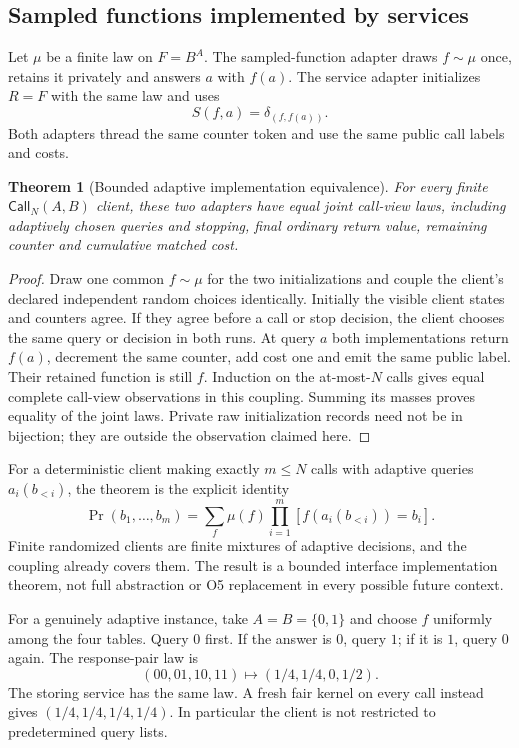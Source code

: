 \documentclass[11pt,a4paper]{article}
\newtheorem{theorem}{Theorem}[section]
\theoremstyle{definition}
\newcommand{\Call}{\mathsf{Call}}
\begin{document}
\subsection{Sampled functions implemented by services}
Let $\mu$ be a finite law on $F=B^A$. The sampled-function adapter draws
$f\sim\mu$ once, retains it privately and answers $a$ with $f(a)$. The
service adapter initializes $R=F$ with the same law and uses
\[
 S(f,a)=\delta_{(f,f(a))}.
\]
Both adapters thread the same counter token and use the same public call
labels and costs.

\begin{theorem}[Bounded adaptive implementation equivalence]\label{thm:service}
For every finite $\Call_N(A,B)$ client, these two adapters have equal
joint call-view laws, including adaptively chosen queries and stopping,
final ordinary return value, remaining counter and cumulative matched cost.
\end{theorem}
\begin{proof}
Draw one common $f\sim\mu$ for the two initializations and couple the
client's declared independent random choices identically. Initially the
visible client states and counters agree. If they agree before a call or
stop decision, the client chooses the same query or decision in both runs.
At query $a$ both implementations return $f(a)$, decrement the same counter,
add cost one and emit the same public label. Their retained function is
still $f$. Induction on the at-most-$N$ calls gives equal complete
call-view observations in this coupling. Summing its masses proves equality
of the joint laws. Private raw initialization records need not be in
bijection; they are outside the observation claimed here.
\end{proof}
For a deterministic client making exactly $m\le N$ calls with adaptive
queries $a_i(b_{<i})$, the theorem is the explicit identity
\[
 \Pr(b_1,\ldots,b_m)
 =\sum_f\mu(f)\prod_{i=1}^m
     [f(a_i(b_{<i}))=b_i].
\]
Finite randomized clients are finite mixtures of adaptive decisions, and
the coupling already covers them. The result is a bounded interface
implementation theorem, not full abstraction or O5 replacement in every
possible future context.

For a genuinely adaptive instance, take $A=B=\{0,1\}$ and choose $f$
uniformly among the four tables. Query $0$ first. If the answer is $0$,
query $1$; if it is $1$, query $0$ again. The response-pair law is
\[
 (00,01,10,11)\longmapsto(1/4,1/4,0,1/2).
\]
The storing service has the same law. A fresh fair kernel on every call
instead gives $(1/4,1/4,1/4,1/4)$. In particular the client is not restricted
to predetermined query lists.
\end{document}
